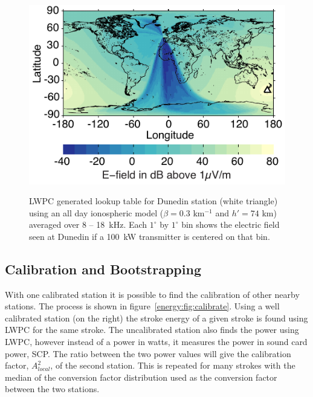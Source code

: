 \begin{figure}[ht!]
\centering
\includegraphics[scale=1]{energy/Figures/PPS_Lookup.pdf}\\
\caption{LWPC generated lookup table for Dunedin station (white triangle) using an all day ionospheric model ($\beta=0.3$ km$^{-1}$ and $h'=74$ km) averaged over 8 -- 18~kHz. Each $1^{\circ}$ by $1^{\circ}$ bin shows the electric field seen at Dunedin if a 100~kW transmitter is centered on that bin.}
\label{energy:fig:lookup}
\end{figure}

\subsection{Calibration and Bootstrapping}

With one calibrated station it is possible to find the calibration of other nearby stations.
The process is shown in figure~\ref{energy:fig:calibrate}.
Using a well calibrated station (on the right) the stroke energy of a given stroke is found using LWPC for the same stroke.
The uncalibrated station also finds the power using LWPC, however instead of a power in watts, it measures the power in sound card power, SCP.
The ratio between the two power values will give the calibration factor, $A_{local}^2$, of the second station.
This is repeated for many strokes with the median of the conversion factor distribution used as the conversion factor between the two stations.


